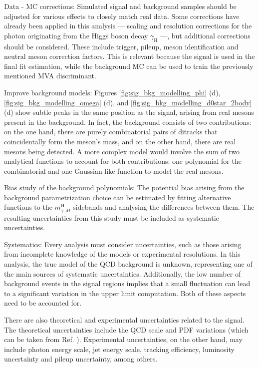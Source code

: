 \begin{myitemlist}
    \item[Data - MC corrections:] Simulated signal and background samples should be adjusted for various effects to closely match real data. Some corrections have already been applied in this analysis --- scaling and resolution corrections for the photon originating from the Higgs boson decay $\gamma_{\text{H}}$ ---, but additional corrections should be considered. These include trigger, pileup, meson identification and neutral meson correction factors. This is relevant because the signal is used in the final fit estimation, while the background MC can be used to train the previously mentioned MVA discriminant.
    
    \item[Improve background models:] Figures \ref{fig:sig_bkg_modelling_phi} (d), \ref{fig:sig_bkg_modelling_omega} (d), and \ref{fig:sig_bkg_modelling_d0star_2body} (d) show subtle peaks in the same position as the signal, arising from real mesons present in the background. In fact, the background consists of two contributions: on the one hand, there are purely combinatorial pairs of ditracks that coincidentally form the meson's mass, and on the other hand, there are real mesons being detected. A more complex model would involve the sum of two analytical functions to account for both contributions: one polynomial for the combinatorial and one Gaussian-like function to model the real mesons.

    \item[Bias study of the background polynomials:] The potential bias arising from the background parametrization choice can be estimated by fitting alternative functions to the $m^{\text{H}}_{\gamma, M}$ sidebands and analysing the differences between them. The resulting uncertainties from this study must be included as systematic uncertainties.

    \item[Systematics:] Every analysis must consider uncertainties, such as those arising from incomplete knowledge of the models or experimental resolutions. In this analysis, the true model of the QCD background is unknown, representing one of the main sources of systematic uncertainties. Additionally, the low number of background events in the signal regions implies that a small fluctuation can lead to a significant variation in the upper limit computation. Both of these aspects need to be accounted for.
    
    There are also theoretical and experimental uncertainties related to the signal. The theoretical uncertainties include the QCD scale and PDF variations (which can be taken from Ref. \cite{LHCHiggsCrossSectionWorkingGroup:2016ypw}). Experimental uncertainties, on the other hand, may include photon energy scale, jet energy scale, tracking efficiency, luminosity uncertainty and pileup uncertainty, among others.
    

\end{myitemlist}
